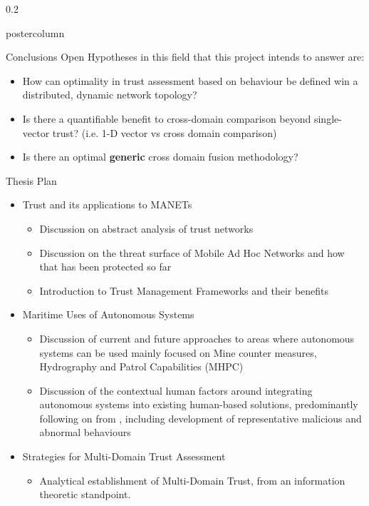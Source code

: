 \documentclass[final,hyperref={pdfpagelabels=false}]{beamer}
\def\colwidth{0.2\linewidth}
\begin{document}
\begin{frame}[fragile]
\begin{columns}[T]
\begin{column}{\colwidth}
\begin{beamercolorbox}[center,wd=\textwidth]{postercolumn}
\begin{minipage}[T]{.98\textwidth}
{\begin{block}{Conclusions}
							Open Hypotheses in this field that this project intends to answer are:
							\begin{itemize}
								\item How can optimality in trust assessment based on behaviour be defined win a distributed, dynamic network topology?
								\item Is there a quantifiable benefit to cross-domain comparison beyond single-vector trust? (i.e. 1-D vector vs cross domain comparison)
								\item Is there an optimal \textbf{generic} cross domain fusion methodology?
							\end{itemize}
						\end{block}
						\begin{block}{Thesis Plan}
							\begin{itemize} 
								\item Trust and its applications to MANETs
								\begin{itemize}
									\item Discussion on abstract analysis of trust networks
									\item Discussion on the threat surface of Mobile Ad Hoc Networks and how that has been protected so far
									\item Introduction to Trust Management Frameworks and their benefits
								\end{itemize}
								\item Maritime Uses of Autonomous Systems
								\begin{itemize}
									\item Discussion of current and future approaches to areas where autonomous systems can be used mainly focused on Mine counter measures, Hydrography and Patrol Capabilities (MHPC)
									\item Discussion of the contextual human factors around integrating autonomous systems into existing human-based solutions, predominantly following on from \cite{Bolster2014a}, including development of representative malicious and abnormal behaviours
								\end{itemize}
								\item Strategies for Multi-Domain Trust Assessment
								\begin{itemize}
									\item Analytical establishment of Multi-Domain Trust, from an information theoretic standpoint.
								\end{itemize}

\end{itemize}
\end{block}}
\end{minipage}
\end{beamercolorbox}
\end{column}
\end{columns}
\end{frame}
\end{document}
